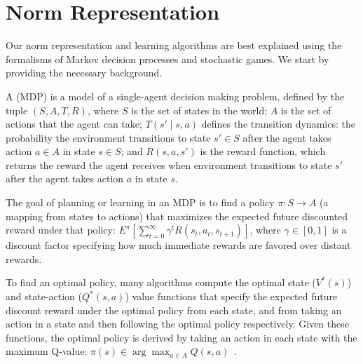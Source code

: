 
\section{Norm Representation}
\label{sec:representation}

Our norm representation and learning algorithms are best explained
using the formalisms of Markov decision processes and stochastic
games.  We start by providing the necessary background.

A  (MDP) is a model of a single-agent
decision making problem, defined by the tuple $(S, A, T, R)$, where
$S$ is the set of states in the world; $A$ is the set of actions that
the agent can take; $T(s' \mid s, a)$ defines the transition dynamics:
the probability the environment transitions to state $s' \in S$
after the agent takes action $a \in A$ in state $s \in S$; and 
$R(s, a, s')$ is the reward function, which returns the reward the
agent receives when environment transitions to state $s'$ after the
agent takes action $a$ in state $s$.

The goal of planning or learning in an MDP is to find a policy $\pi :
S \rightarrow A$ (a mapping from states to actions) that maximizes the
expected future discounted reward under that policy: $E^{\pi} \left[
  \sum_{t=0}^\infty \gamma^t R(s_t, a_t, s_{t+1}) \right]$, where
$\gamma \in [0, 1]$ is a discount factor specifying how much immediate
rewards are favored over distant rewards. 

To find an optimal policy, many algorithms compute the optimal state
($V^*(s)$) and state-action ($Q^*(s,a)$) value functions that specify
the expected future discount reward under the optimal policy from each
state, and from taking an action in a state and then following the
optimal policy respectively. 
Given these functions, the optimal policy is derived by taking an
action in each state with the maximum Q-value: 
$\pi(s) \in \arg\max_{a \in A} Q(s, a)$~\cite{bertsekas87}.

